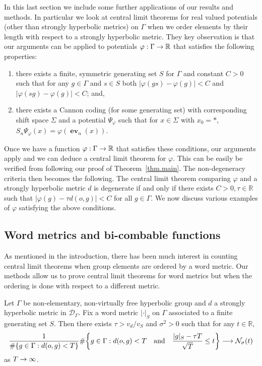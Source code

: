 \documentclass[AHL,Unicode,longabstracts,published]{cedram}
\newcommand{\G}{\Gamma}
\renewcommand{\P}{\Psi}
\newcommand{\Dc}{\mathcal{D}}
\newcommand{\Nc}{\mathcal{N}}
\newcommand{\R}{\mathbb{R}}
\DeclareMathOperator{\ev}{\mathbf{ev}}
\let\originalleft\left
\let\originalright\right
\renewcommand{\left}{\mathopen{}\mathclose\bgroup\originalleft}
\renewcommand{\right}{\aftergroup\egroup\originalright}
\renewcommand*{\to}{\mathchoice{\longrightarrow}{\rightarrow}{\rightarrow}{\rightarrow}}
\theoremstyle{plain}
\newcommand*{\relabel}{\renewcommand{\labelenumi}{(\theenumi)}}
\newcommand*{\romanenumi}{\renewcommand*{\theenumi}{\roman{enumi}}\relabel}
\newcommand{\G}{\Gamma}
\begin{document}
In this last section we include some further applications of our results and methods. In particular we look at central limit theorems for real valued potentials (other than strongly hyperbolic metrics) on $\G$ when we order elements by their length with respect to a strongly hyperbolic metric. They key observation is that our arguments can be applied to potentials $\varphi : \G \to \R$ that satisfies the following properties:
\begin{enumerate}\romanenumi
\item \label{sect4.i} there exists a finite, symmetric generating set $S$ for $\G$ and constant $C >0$ such that for any $g \in \G$ and $s \in S$ both $|\varphi(gs) - \varphi(g)| < C$ and $|\varphi(sg) - \varphi(g)| < C$; and,
\item\label{sect4.ii} there exists a Cannon coding (for some generating set) with corresponding shift space $\Sigma$ and a potential $\P_{\varphi}$ such that for $x \in \Sigma$ with $x_0 = \ast$, $S_n \P_{\varphi}(x)= \varphi(\ev_n(x))$.
\end{enumerate}
Once we have a function $\varphi: \G \to \R$ that satisfies these conditions, our arguments apply and we can deduce a central limit theorem for $\varphi$. This can be easily be verified from following our proof of Theorem~\ref{thm.main}. The non-degeneracy criteria then becomes the following. The central limit theorem comparing $\varphi$ and a strongly hyperbolic metric $d$ is degenerate if and only if there exists $C >0, \tau \in \R$ such that $|\varphi(g) - \tau d(o,g) |<C$ for all $g \in \G$. We now discuss various examples of $\varphi$ satisfying the above conditions.

\subsection{Word metrics and bi-combable functions} As mentioned in the introduction, there has been much interest in counting central limit theorems when group elements are ordered by a word metric. Our methods allow us to prove central limit theorems for word metrics but when the ordering is done with respect to a different metric.

\begin{theo}
Let $\G$ be non-elementary, non-virtually free hyperbolic group and $d$ a strongly hyperbolic metric in $\Dc_\G$. Fix a word metric $|\cdot|_S$ on $\G$ associated to a finite generating set $S$. Then there exists $\tau > v_d/v_S$ and $\sigma^2 > 0$ such that for any $t \in \R$,
\[
\frac{1}{\#\{ g\in\G: d(o,g) < T\}} \#\left\{ g\in\G: d(o,g) < T \quad \text{and} \quad \frac{|g|_S - \tau T}{\sqrt{T}} \le t \right\} \to \Nc_\sigma(t)
\]
as $T\to\infty$.
\end{theo}
\end{document}
